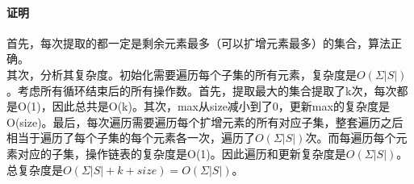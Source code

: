 \documentclass{article}
\begin{document}
\begin{CJK}{UTF8}{gkai}
\paragraph{证明}
首先，每次提取的都一定是剩余元素最多（可以扩增元素最多）的集合，算法正确。\\
其次，分析其复杂度。初始化需要遍历每个子集的所有元素，复杂度是$O(\Sigma|S|)$。考虑所有循环结束后的所有操作数。首先，提取最大的集合提取了k次，每次都是O(1)，因此总共是O(k)。其次，max从size减小到了0，更新max的复杂度是O(size)。最后，每次遍历需要遍历每个扩增元素的所有对应子集，整套遍历之后相当于遍历了每个子集的每个元素各一次，遍历了$O(\Sigma|S|)$次。而每遍历每个元素对应的子集，操作链表的复杂度是O(1)。因此遍历和更新复杂度是$O(\Sigma|S|)$。总复杂度是$O(\Sigma|S|+k+size)=O(\Sigma|S|)$。
\end{CJK}
\end{document}

